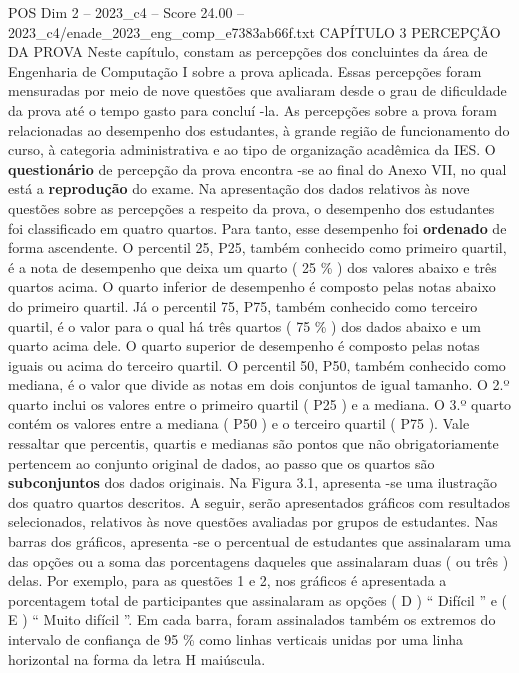 \begin{textsample}{POS Dim 2 – 2023\_c4 – Score 24.00 – 2023\_c4/enade\_2023\_eng\_comp\_e7383ab66f.txt}  \label{ex:f2_pos_004}
CAPÍTULO 3 PERCEPÇÃO DA PROVA Neste capítulo, constam as percepções dos concluintes da área de Engenharia de Computação I sobre a prova aplicada.
Essas percepções foram mensuradas por meio de nove questões que avaliaram desde o grau de dificuldade da prova até o tempo gasto para concluí -la.
As percepções sobre a prova foram relacionadas ao desempenho dos estudantes, à grande região de funcionamento do curso, à categoria administrativa e ao tipo de organização acadêmica da IES.
O \textbf{questionário} de percepção da prova encontra -se ao final do Anexo VII, no qual está a \textbf{reprodução} do exame.
Na apresentação dos dados relativos às nove questões sobre as percepções a respeito da prova, o desempenho dos estudantes foi classificado em quatro quartos.
Para tanto, esse desempenho foi \textbf{ordenado} de forma ascendente.
O percentil 25, P25, também conhecido como primeiro quartil, é a nota de desempenho que deixa um quarto ( 25 \% ) dos valores abaixo e três quartos acima.
O quarto inferior de desempenho é composto pelas notas abaixo do primeiro quartil.
Já o percentil 75, P75, também conhecido como terceiro quartil, é o valor para o qual há três quartos ( 75 \% ) dos dados abaixo e um quarto acima dele.
O quarto superior de desempenho é composto pelas notas iguais ou acima do terceiro quartil.
O percentil 50, P50, também conhecido como mediana, é o valor que divide as notas em dois conjuntos de igual tamanho.
O 2.º quarto inclui os valores entre o primeiro quartil ( P25 ) e a mediana.
O 3.º quarto contém os valores entre a mediana ( P50 ) e o terceiro quartil ( P75 ).
Vale ressaltar que percentis, quartis e medianas são pontos que não obrigatoriamente pertencem ao conjunto original de dados, ao passo que os quartos são \textbf{subconjuntos} dos dados originais.
Na Figura 3.1, apresenta -se uma ilustração dos quatro quartos descritos.
A seguir, serão apresentados gráficos com resultados selecionados, relativos às nove questões avaliadas por grupos de estudantes.
Nas barras dos gráficos, apresenta -se o percentual de estudantes que assinalaram uma das opções ou a soma das porcentagens daqueles que assinalaram duas ( ou três ) delas.
Por exemplo, para as questões 1 e 2, nos gráficos é apresentada a porcentagem total de participantes que assinalaram as opções ( D ) “ Difícil ” e ( E ) “ Muito difícil ”.
Em cada barra, foram assinalados também os extremos do intervalo de confiança de 95 \% como linhas verticais unidas por uma linha horizontal na forma da letra H maiúscula.

\end{textsample}
